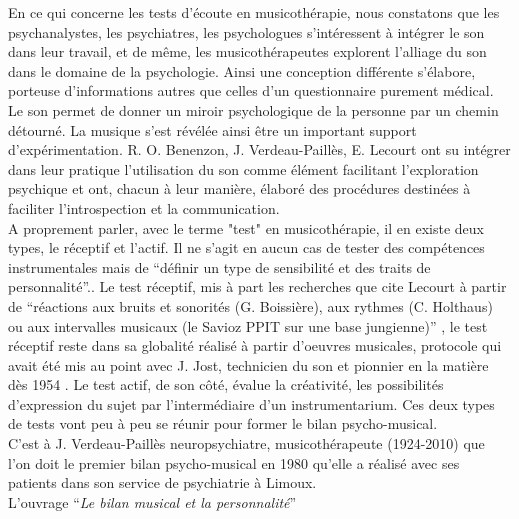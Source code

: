 En ce qui concerne les tests d'écoute en musicothérapie, nous constatons que les psychanalystes, les 
psychiatres, les psychologues
s'intéressent à intégrer le son dans leur travail, et de même, les musicothérapeutes 
\label{musicothEtpsycho}
explorent l'alliage du son
  dans le domaine de la psychologie.%
 Ainsi une conception différente s'élabore, porteuse d'informations autres que
 celles d'un questionnaire purement médical. Le son permet de donner un miroir
 psychologique de la personne par un chemin détourné.
La musique s'est révélée ainsi être un important support
         d'expérimentation. R. O.  Benenzon, J. Verdeau-Paillès, E. Lecourt 
         ont su intégrer dans leur pratique l'utilisation du son comme
         élément facilitant l'exploration psychique et
         ont, chacun à leur manière, élaboré des procédures destinées à faciliter
         l'introspection et la communication.
\\
 A proprement parler, avec le terme "test" en musicothérapie, il en existe deux types, le réceptif et 
         l'actif. Il ne s'agit en aucun cas de tester des compétences instrumentales mais de \enquote {définir 
         un type de sensibilité et des traits de personnalité}.\autocite[83]{lecourt_les_2017}.
Le test réceptif, mis à part les recherches que cite Lecourt à partir de \enquote {réactions aux bruits et 
sonorités (G. Boissière), aux rythmes (C. Holthaus) ou aux intervalles musicaux (le Savioz PPIT sur une 
base jungienne)} \autocite[83]{lecourt_les_2017}, le test réceptif reste dans sa globalité réalisé à partir 
d'oeuvres musicales, protocole qui avait été mis au point avec J. Jost, technicien du son et pionnier en la 
matière dès 1954 \autocite{Jost}.
         Le test actif, de son côté, évalue la créativité, les possibilités d'expression du sujet par l'intermédiaire d'un instrumentarium. Ces deux types  de tests vont peu à peu se réunir pour former
                 le  bilan
                     psycho-musical.
\\
C'est à J. Verdeau-Paillès neuropsychiatre,
  musicothérapeute (1924-2010) que l'on doit le premier bilan
                     psycho-musical en 1980 qu'elle a réalisé avec ses patients dans son service
                     de psychiatrie à Limoux.
                     \\
L'ouvrage \enquote {\textit{Le bilan musical et la personnalité}}\autocite{verdeau-pailles:bilan}
